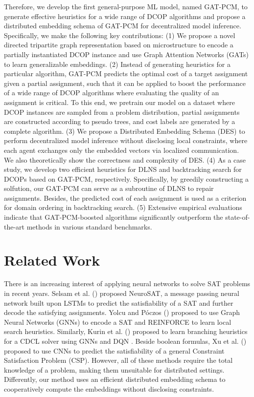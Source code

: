 \documentclass[letterpaper]{article} %
\begin{document}
Therefore, we develop the first general-purpose ML model, named GAT-PCM, to generate effective heuristics for a wide range of DCOP algorithms and propose a distributed embedding schema of GAT-PCM for decentralized model inference. Specifically, we make the following key contributions: (1) We propose a novel directed tripartite graph representation based on microstructure \cite{jegou1993decomposition} to encode a partially instantiated DCOP instance and use Graph Attention Networks (GATs) \cite{vaswani2017attention} to learn generalizable embeddings. (2) Instead of generating heuristics for a particular algorithm, GAT-PCM predicts the optimal cost of a target assignment given a partial assignment, such that it can be applied to boost the performance of a wide range of DCOP algorithms where evaluating the quality of an assignment is critical.
To this end, we pretrain our model on a dataset where DCOP instances are sampled from a problem distribution, partial assignments are constructed according to pseudo trees, and cost labels are generated by a complete algorithm.
(3) We propose a Distributed Embedding Schema (DES) to perform decentralized model inference without disclosing local constraints, where each agent exchanges only the embedded vectors via localized communication. We also theoretically show the correctness and complexity of DES.
(4) As a case study, we develop two efficient heuristics for DLNS \cite{hoang2018large} and backtracking search for DCOPs based on GAT-PCM, respectively. Specifically, by greedily constructing a solfution, our GAT-PCM can serve as a subroutine of DLNS to repair assignments. Besides, the predicted cost of each assignment is used as a criterion for domain ordering in backtracking search. (5) Extensive empirical evaluations indicate that GAT-PCM-boosted algorithms significantly outperform the state-of-the-art methods in various standard benchmarks.

\section{Related Work}
There is an increasing interest of applying neural networks to solve SAT problems in recent years. Selsam et al. (\citeyear{selsamLBLMD19}) proposed NeuroSAT, a message passing neural network built upon LSTMs \cite{hochreiter1997long} to predict the satisfiability of a SAT and further decode the satisfying assignments. Yolcu and P{\'o}czos (\citeyear{yolcu2019learning}) proposed to use Graph Neural Networks (GNNs) to encode a SAT and REINFORCE \cite{williams1992simple} to learn local search heuristics. Similarly, Kurin et al. (\citeyear{kurin2020can}) proposed to learn branching heuristics for a CDCL solver \cite{een2003extensible} using GNNs and DQN \cite{mnih2015human}. Beside boolean formulas, Xu et al. (\citeyear{xu2018towards}) proposed to use CNNs \cite{cunBDHHHJ89} to predict the satisfiability of a general Constraint Satisfaction Problem (CSP). However, all of these methods require the total knowledge of a problem, making them unsuitable for distributed settings. Differently, our method uses an efficient distributed embedding schema to cooperatively compute the embeddings without disclosing constraints.
\end{document}
